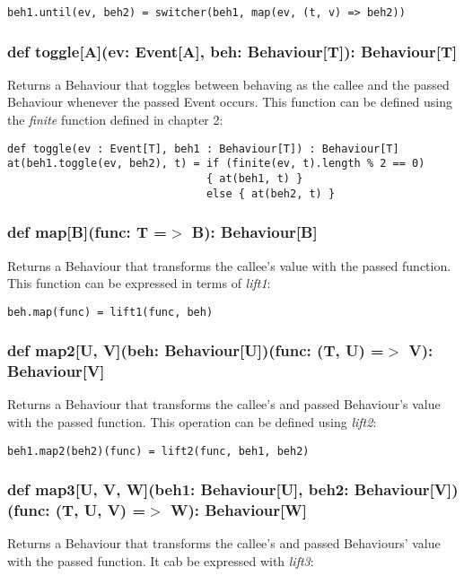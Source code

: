 \begin{verbatim}
beh1.until(ev, beh2) = switcher(beh1, map(ev, (t, v) => beh2))
\end{verbatim}      
      
    \subsubsection*{def toggle[A](ev: Event[A], beh: Behaviour[T]): Behaviour[T]}
      Returns a Behaviour that toggles between behaving as the callee
      and the passed Behaviour whenever the passed Event occurs. This function
      can be defined using the \emph{finite} function defined in chapter 2:

\begin{verbatim}
def toggle(ev : Event[T], beh1 : Behaviour[T]) : Behaviour[T]
at(beh1.toggle(ev, beh2), t) = if (finite(ev, t).length % 2 == 0)
                               { at(beh1, t) } 
                               else { at(beh2, t) }
\end{verbatim}

    \subsubsection*{def map[B](func: T =$>$ B): Behaviour[B]}
      Returns a Behaviour that transforms the callee's
      value with the passed function.
      This function can be expressed in terms of \emph{lift1}:

\begin{verbatim}
beh.map(func) = lift1(func, beh)
\end{verbatim}      
      
    \subsubsection*{def map2[U, V](beh: Behaviour[U])(func: (T, U) =$>$ V): Behaviour[V]}
      Returns a Behaviour that transforms the callee's
      and passed Behaviour's value with the passed function. This operation
      can be defined using \emph{lift2}:

\begin{verbatim}
beh1.map2(beh2)(func) = lift2(func, beh1, beh2)
\end{verbatim}      

    \subsubsection*{def map3[U, V, W](beh1: Behaviour[U], beh2: Behaviour[V])(func: (T, U, V) =$>$ W): Behaviour[W]}
      Returns a Behaviour that transforms the callee's
      and passed Behaviours' value with the passed function. It cab
      be expressed with \emph{lift3}:


